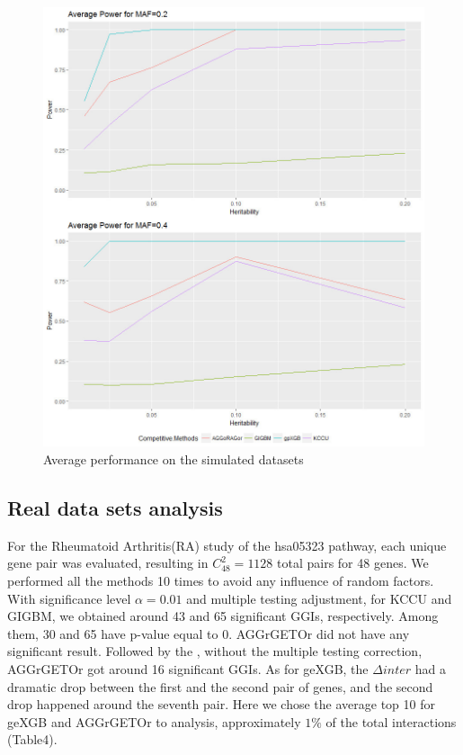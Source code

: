 \documentclass[11pt]{article}
\theoremstyle{plain}
\theoremstyle{definition}
\theoremstyle{remark}
\begin{document}
\begin{figure}[H]
    \begin{center}
       \includegraphics[scale=0.5]{average0204.jpg}
    \end{center}
\caption{\label{avg}Average performance on the simulated datasets}
\end{figure}


\subsection{Real data sets analysis}

For the Rheumatoid Arthritis(RA) study of the hsa05323 pathway, each unique gene pair was evaluated, resulting in $C_{48}^2=1128$ total pairs for 48 genes. We performed all the methods 10 times to avoid any influence of random factors. With significance level $\alpha=0.01$ and multiple testing adjustment, for KCCU and GIGBM, we obtained around 43 and 65 significant GGIs, respectively. Among them, 30 and 65 have p-value equal to 0. AGGrGETOr did not have any significant result. Followed by the \cite{7}, without the multiple testing correction, AGGrGETOr got around 16 significant GGIs. As for geXGB, the $\Delta inter$ had a dramatic drop between the first and the second pair of genes, and the second drop happened around the seventh pair. Here we chose the average top 10 for geXGB and AGGrGETOr to analysis, approximately $1\%$ of the total interactions (Table4).
\end{document}
